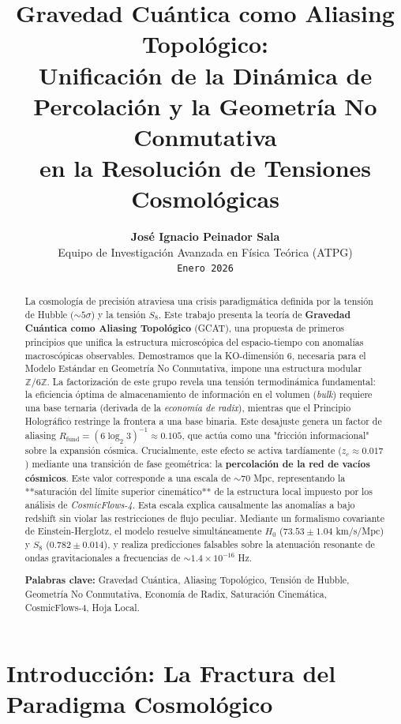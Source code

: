 \documentclass[12pt, a4paper]{article}
\title{\textbf{Gravedad Cuántica como Aliasing Topológico:} \\ Unificación de la Dinámica de Percolación y la Geometría No Conmutativa \\ en la Resolución de Tensiones Cosmológicas}
\author{\textbf{José Ignacio Peinador Sala} \\ \small{Equipo de Investigación Avanzada en Física Teórica (ATPG)} \\ \small{\texttt{Enero 2026}}}
\date{}
\theoremstyle{plain}
\theoremstyle{definition}
\begin{document}
\maketitle

\begin{abstract}
\noindent
La cosmología de precisión atraviesa una crisis paradigmática definida por la tensión de Hubble ($\sim 5\sigma$) y la tensión $S_8$. Este trabajo presenta la teoría de \textbf{Gravedad Cuántica como Aliasing Topológico} (GCAT), una propuesta de primeros principios que unifica la estructura microscópica del espacio-tiempo con anomalías macroscópicas observables. Demostramos que la KO-dimensión 6, necesaria para el Modelo Estándar en Geometría No Conmutativa, impone una estructura modular $\mathbb{Z}/6\mathbb{Z}$. La factorización de este grupo revela una tensión termodinámica fundamental: la eficiencia óptima de almacenamiento de información en el volumen (\textit{bulk}) requiere una base ternaria (derivada de la \textit{economía de radix}), mientras que el Principio Holográfico restringe la frontera a una base binaria. Este desajuste genera un factor de aliasing $R_{\text{fund}} = (6\log_2 3)^{-1} \approx 0.105$, que actúa como una "fricción informacional" sobre la expansión cósmica. Crucialmente, este efecto se activa tardíamente ($z_c \approx 0.017$) mediante una transición de fase geométrica: la \textbf{percolación de la red de vacíos cósmicos}. Este valor corresponde a una escala de $\sim 70$ Mpc, representando la **saturación del límite superior cinemático** de la estructura local impuesto por los análisis de \textit{CosmicFlows-4}. Esta escala explica causalmente las anomalías a bajo redshift sin violar las restricciones de flujo peculiar. Mediante un formalismo covariante de Einstein-Herglotz, el modelo resuelve simultáneamente $H_0$ ($73.53 \pm 1.04$ km/s/Mpc) y $S_8$ ($0.782 \pm 0.014$), y realiza predicciones falsables sobre la atenuación resonante de ondas gravitacionales a frecuencias de $\sim 1.4 \times 10^{-16}$ Hz.

\vspace{0.5cm}
\noindent \textbf{Palabras clave:} Gravedad Cuántica, Aliasing Topológico, Tensión de Hubble, Geometría No Conmutativa, Economía de Radix, Saturación Cinemática, CosmicFlows-4, Hoja Local.
\end{abstract}

\section{Introducción: La Fractura del Paradigma Cosmológico}
\label{sec:introduccion}
\end{document}

